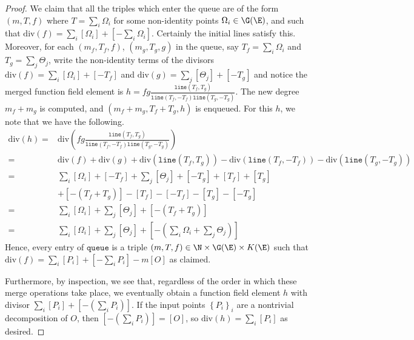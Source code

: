 \documentclass[11pt,letterpaper]{article}
\theoremstyle{definition}
\newcommand{\6}{\mathbf}
\newcommand{\7}{\mathcal}
\begin{document}
\begin{proof}
We claim that all the triples which enter the queue are of the form $(m, T, f)$ where $T=\sum_i \Omega_i$ for some non-identity points $\Omega_i \in \G(\E)$, and such that $\text{div}(f) = \sum_i [\Omega_i] + [-\sum_i \Omega_i]$. Certainly the initial lines satisfy this. Moreover, for each $(m_f, T_f, f)$, $(m_g, T_g, g)$ in the queue, say $T_f = \sum_i \Omega_i$ and $T_g = \sum_j \Theta_j$, write the non-identity terms of the divisors $\text{div}(f) = \sum_i [\Omega_i] + [-T_f]$ and $\text{div}(g) = \sum_j [\Theta_j] + [-T_g]$ and notice the merged function field element is $h=fg\frac{\texttt{line}(T_f,T_g)}{\texttt{line}(T_f,-T_f)\texttt{line}(T_g,-T_g)}$. The new degree $m_f + m_g$ is computed, and $(m_f + m_g, T_f + T_g, h)$ is enqueued. For this $h$, we note that we have the following.
\begin{align}
\text{div}(h) =& \text{div}\left(fg\frac{\texttt{line}(T_f,T_g)}{\texttt{line}(T_f,-T_f)\texttt{line}(T_g,-T_g)}\right) \\
=& \text{div}(f)+ \text{div}(g) + \text{div}(\texttt{line}(T_f,T_g)) - \text{div}(\texttt{line}(T_f,-T_f)) - \text{div}(\texttt{line}(T_g,-T_g)) \\
=& \sum_i [\Omega_i] + [-T_f] + \sum_j [\Theta_j] + [-T_g] + [T_f] + [T_g] \\& + [-(T_f+T_g)] - [T_f] - [-T_f] - [T_g] - [-T_g] \\
=& \sum_i [\Omega_i] + \sum_j [\Theta_j] + [-(T_f + T_g)] \\
=& \sum_i [\Omega_i] + \sum_j [\Theta_j] + [-(\sum_i \Omega_i + \sum_j \Theta_j)] 
\end{align}
Hence, every entry of $\texttt{queue}$ is a triple $(m, T, f) \in \N \times \G(\E) \times K(\E)$ such that $\text{div}(f) = \sum_i [P_i] + [-\sum_i P_i] - m[O]$ as claimed.

Furthermore, by inspection, we see that, regardless of the order in which these merge operations take place, we eventually obtain a function field element $h$ with divisor $\sum_i [P_i] + [-(\sum_i P_i)]$. If the input points $\left\{P_i\right\}_i$ are a nontrivial decomposition of $O$, then $[-(\sum_i P_i)] = [O]$, so $\text{div}(h) = \sum_i [P_i]$ as desired.
\end{proof}
\end{document}
